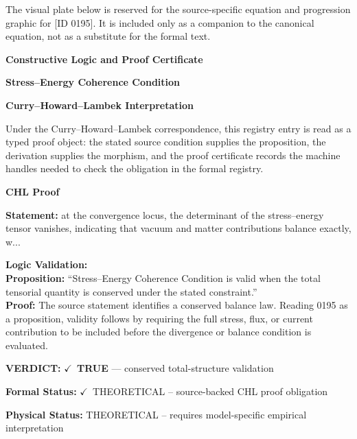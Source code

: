 \begingroup\footnotesize\sloppy
The visual plate below is reserved for the source-specific equation and progression graphic for [ID 0195]. It is included only as a companion to the canonical equation, not as a substitute for the formal text.
\par\endgroup
\ifTZPDarkEdition
{}
\fi

\clearpage
\begingroup\tzpsupportsetup
\noindent\textbf{\fontsize{10.8pt}{12.8pt}\selectfont [ID 0195] Constructive Logic and Proof Certificate}\par
\noindent\textbf{\fontsize{10pt}{12pt}\selectfont Stress--Energy Coherence Condition}\par
\vspace{0.45em}
\begingroup
\footnotesize
\setlength{\parskip}{0.22em}
\setlength{\parindent}{0pt}
\noindent\textbf{Curry--Howard--Lambek Interpretation}\par
Under the Curry--Howard--Lambek correspondence, this registry entry is read as a typed proof
object: the stated source condition supplies the proposition, the derivation supplies the
morphism, and the proof certificate records the machine handles needed to check the obligation
in the formal registry.

\vspace{0.45em}
\noindent\textbf{CHL Proof}\par
\textbf{Statement:} at the convergence locus, the determinant of the stress--energy tensor vanishes,
indicating that vacuum and matter contributions balance exactly, w...

\textbf{Logic Validation:}\\
\textbf{Proposition:} ``Stress--Energy Coherence Condition is valid when the total tensorial quantity is
conserved under the stated constraint.''\\
\textbf{Proof:} The source statement identifies a conserved balance law. Reading 0195 as a proposition,
validity follows by requiring the full stress, flux, or current contribution to be
included before the divergence or balance condition is evaluated.

\textbf{VERDICT:} \ensuremath{\checkmark}\ \textbf{TRUE} --- conserved total-structure validation

\textbf{Formal Status:} \ensuremath{\checkmark}\ THEORETICAL -- source-backed CHL proof obligation

\textbf{Physical Status:} THEORETICAL -- requires model-specific empirical interpretation
\par\vspace{0.45em}
\par
\ifTZPDarkEdition
{}
\fi
\endgroup
\endgroup
